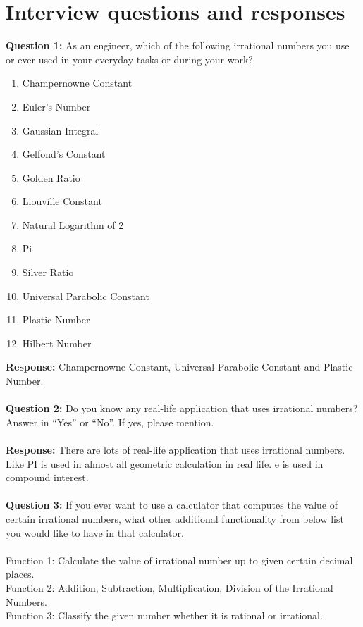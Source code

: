 \section{Interview questions and responses}
\textbf{Question 1:} As an engineer, which of the following irrational numbers you use or ever used in your everyday tasks or during your work?
\begin{enumerate}
  \item Champernowne Constant
  \item Euler’s Number
  \item Gaussian Integral
  \item Gelfond’s Constant
  \item Golden Ratio
  \item Liouville Constant
  \item Natural Logarithm of 2
  \item Pi 
  \item Silver Ratio
  \item Universal Parabolic Constant
  \item Plastic Number
  \item Hilbert Number
\end{enumerate} 
\textbf{Response: } Champernowne Constant, Universal Parabolic Constant and Plastic Number.\\ \\
\textbf{Question 2:} Do you know any real-life application that uses irrational numbers? \\
Answer in “Yes” or “No”. If yes, please mention.\\ \\
\textbf{Response:} There are lots of real-life application that uses irrational numbers. Like PI is used in almost all geometric calculation in real life. e is used in compound interest. \\ \\
\textbf{Question 3:} If you ever want to use a calculator that computes the value of certain irrational numbers, what other additional functionality from below list you would like to have in that calculator.\\ \\
    Function 1: Calculate the value of irrational number up to given certain decimal places.\\
    Function 2: Addition, Subtraction, Multiplication, Division of the Irrational Numbers.\\
    Function 3: Classify the given number whether it is rational or irrational.\\
